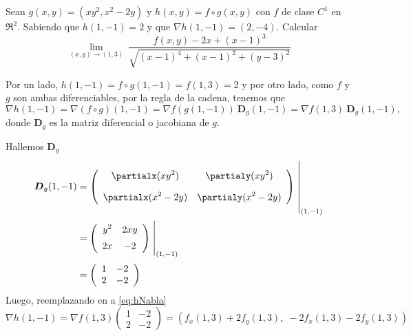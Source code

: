 \begin{solution}
    Sean $g(x,y)=(xy^2,x^2-2y)$ y $h(x,y)=f \circ g(x,y)$ con $f$ de clase $C^1$ en $\Re^2$. Sabiendo que $h(1,-1)=2$ y que $\nabla h(1,-1)=(2,-4)$. Calcular
    \[
        \lim_{(x,y)\to (1,3)} \ 
        \frac{f(x,y)-2x+(x-1)^3}{\sqrt{(x-1)^4+(x-1)^2+(y-3)^2}}       
    \]

 Por un lado,      $h(1,-1)= f\circ g (1,-1) =  f(1,3)=2$  y por otro lado,  como $f$ y $g$ son ambas diferenciables,  por la regla de la cadena,  tenemos que
    \begin{equation}
        \nabla h(1,-1)=\nabla (f\circ g)(1,-1)=\nabla f(g(1,-1)) \:\boldsymbol{D}_g(1,-1) = \nabla f (1,3) \:\boldsymbol{D}_g(1,-1),  \label{eq:hNabla}
    \end{equation}    donde $\boldsymbol{D}_g$ es la matriz diferencial o  jacobiana de $g$.

    
    \noindent  Hallemos $\boldsymbol{D}_g$
    \begin{align*}
        \boldsymbol{D}_g(1,-1) & =
        \left(\begin{array}{cc}
                      \displaystyle\partialx (xy^2)            & \displaystyle\partialy (xy^2)           \\[10pt]
                      \displaystyle\partialx  (x^2 -2y) & \displaystyle\partialy (x^2 -2y)
                  \end{array}\right)\left.\rule{0pt}{1.1cm}\right\rvert_{(1,-1)}             \\[2pt]
                              & =\left(\begin{array}{cc}
                                               \displaystyle y^2                 & \displaystyle 2xy              \\[5pt]
                                               \displaystyle   2x & \displaystyle -2
                                           \end{array}\right)\left.\rule{0pt}{0.7cm}\right\rvert_{(1,-1)} \\[2pt]
                              & =\left(\begin{array}{cc}
                                               1    & -2    \\
                                               2 & -2
                                           \end{array}\right)
    \end{align*}
    Luego, reemplazando en  a   \eqref{eq:hNabla}
    \[
        \nabla h(1,-1) = \nabla f(1,3)\left(\begin{array}{cc}
                1   & -2    \\
                2 & -2
            \end{array}\right) = \left(f_x(1,3) + 2f_y(1,3),\;-2f_x(1,3)-2f_y(1,3)\right)
    \]


\end{solution}
